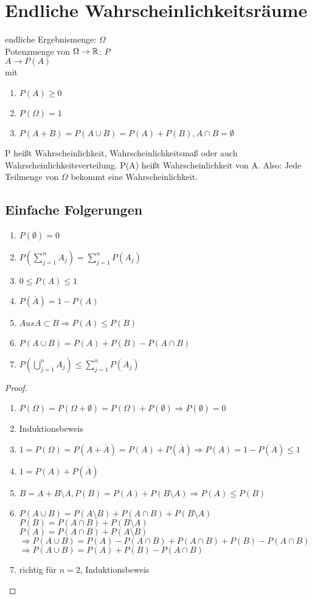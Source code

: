 \section{Endliche Wahrscheinlichkeitsräume}
endliche Ergebnismenge: $ \Omega $\\
Potenzmenge von $ \Omega \rightarrow \mathbb{R}$: $ P $\\
$ A \rightarrow P(A) $\\
mit
\begin{enumerate}
\item $ P(A)  \geq 0 $
\item $ P(\Omega) = 1 $
\item $ P(A+B)=P(A\cup B) = P(A) + P(B), A\cap B=\emptyset $
\end{enumerate}
P heißt Wahrscheinlichkeit, Wahrscheinlichkeitsmaß oder auch Wahrscheinlichkeitsverteilung. P(A) heißt Wahrscheinlichkeit von A. Also: Jede Teilmenge von $ \Omega $ bekommt eine Wahrscheinlichkeit. 

\subsection{Einfache Folgerungen}

\begin{enumerate}
\item $ P(\emptyset) = 0 $
\item $ P(\sum_{j=1}^{n} A_j) = \sum_{j=1}^{n} P(A_j) $ 
\item $ 0\leq P(A)\leq 1 $ 
\item $ P(\overline{A}) = 1-P(A) $ 
\item $ Aus A\subset B \Rightarrow P(A)\leq P(B) $ 
\item $ P(A\cup B) = P(A)+P(B) - P(A\cap B) $ 
\item $ P(\bigcup_{j=1}^n A_j) \leq \sum_{j=1}^{n} P(A_j) $ 
\end{enumerate}

\begin{proof}
\begin{enumerate}
\item $ P(\Omega)= P(\Omega + \emptyset) = P(\Omega) + P(\emptyset) \Rightarrow P(\emptyset) = 0 $ 
\item Induktionsbeweis 
\item $ 1 = P(\Omega) = P(A + \overline{A})= P(A) + P(\overline{A}) \Rightarrow P(A) = 1 - P(\overline{A}) \leq 1 $ 
\item $ 1= P(A) + P(\overline{A}) $ 
\item $ B=A+B \setminus A, P(B)=P(A) + P(B\setminus A) \Rightarrow P(A) \leq P(B) $ 
\item $ P(A\cup B)= P(A\setminus B) + P(A\cap B) + P(B\setminus A) $\\
	$ P(B) = P(A\cap B) + P(B\setminus A) $ \\
	$ P(A) = P(A\cap B) + P(A\setminus B) $\\
	$ \Rightarrow P(A\cup B) = P(A) - P(A\cap B) + P(A\cap B) + P(B) - P(A\cap B) $
	$ \Rightarrow P(A\cup B) = P(A) + P(B) - P(A\cap B) $
\item richtig für $ n=2 $, Induktionsbeweis 
\end{enumerate}
\end{proof}

